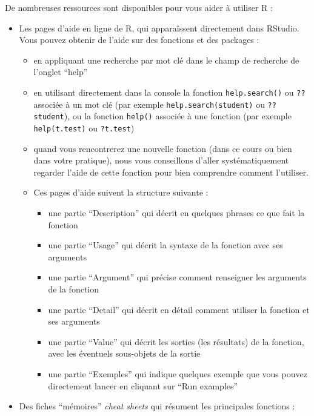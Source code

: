\documentclass[
]{book}
\providecommand{\tightlist}{%
  \setlength{\itemsep}{0pt}\setlength{\parskip}{0pt}}
\begin{document}
De nombreuses ressources sont disponibles pour vous aider à utiliser R :

\begin{itemize}
\item
  Les pages d'aide en ligne de R, qui apparaîssent directement dans RStudio. Vous pouvez obtenir de l'aide sur des fonctions et des packages :

  \begin{itemize}
  \tightlist
  \item
    en appliquant une recherche par mot clé dans le champ de recherche de l'onglet ``help''
  \item
    en utilisant directement dans la console la fonction \texttt{help.search()} ou \texttt{??} associée à un mot clé (par exemple \texttt{help.search(student)} ou \texttt{??student}), ou la fonction \texttt{help()} associée à une fonction (par exemple \texttt{help(t.test)} ou \texttt{?t.test})
  \item
    quand vous rencontrerez une nouvelle fonction (dans ce cours ou bien dans votre pratique), nous vous conseillons d'aller systématiquement regarder l'aide de cette fonction pour bien comprendre comment l'utiliser.
  \item
    Ces pages d'aide suivent la structure suivante :

    \begin{itemize}
    \tightlist
    \item
      une partie ``Description'' qui décrit en quelques phrases ce que fait la fonction
    \item
      une partie ``Usage'' qui décrit la syntaxe de la fonction avec ses arguments
    \item
      une partie ``Argument'' qui précise comment renseigner les arguments de la fonction
    \item
      une partie ``Detail'' qui décrit en détail comment utiliser la fonction et ses arguments
    \item
      une partie ``Value'' qui décrit les sorties (les résultats) de la fonction, avec les éventuels sous-objets de la sortie
    \item
      une partie ``Exemples'' qui indique quelques exemple que vous pouvez directement lancer en cliquant sur ``Run examples''
    \end{itemize}
  \end{itemize}
\item
  Des fiches ``mémoires'' \emph{cheat sheets} qui résument les principales fonctions :


\end{itemize}
\end{document}
